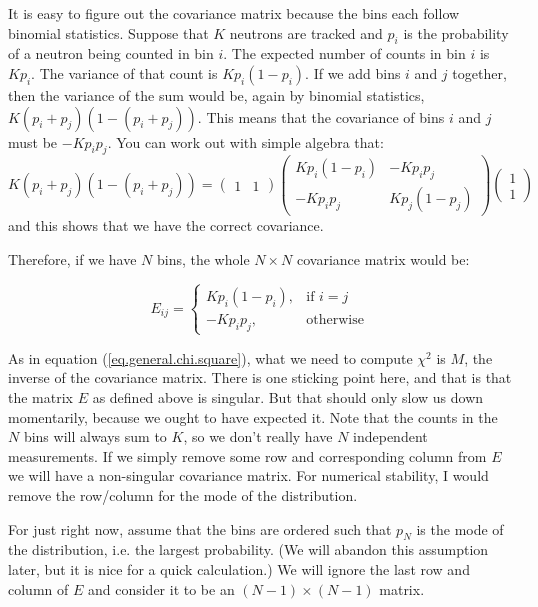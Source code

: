\documentclass[letterpaper,12pt]{article}
\newcommand{\myMatrix}[1]{\bm{\mathit{#1}}}
\begin{document}
It is easy to figure out the covariance matrix because the bins each follow binomial statistics. Suppose that $K$ neutrons are tracked and $p_i$ is the probability of a neutron being counted in bin $i$. The expected number of counts in bin $i$ is $Kp_i$. The variance of that count is $Kp_i(1-p_i)$. If we add bins $i$ and $j$ together, then the variance of the sum would be, again by binomial statistics, $K(p_i+p_j)(1-(p_i+p_j))$. This means that the covariance of bins $i$ and $j$ must be $-Kp_ip_j$. You can work out with simple algebra that:
\begin{equation}
	K(p_i+p_j)(1-(p_i+p_j))=
	\begin{pmatrix}
		1 & 1
	\end{pmatrix}
	\begin{pmatrix}
	Kp_i(1-p_i) & -Kp_ip_j \\
	-Kp_ip_j & Kp_j(1-p_j) 
	\end{pmatrix}
	\begin{pmatrix}
	1 \\
	1
	\end{pmatrix}
\end{equation}
and this shows that we have the correct covariance.

Therefore, if we have $N$ bins, the whole $N \times N$ covariance matrix would be:

\begin{equation} \label{eq.cov.E}
	\myMatrix{E}_{ij}=
	\begin{cases}
		Kp_i(1-p_i), & \text{if } i=j \\
		-Kp_ip_j,  & \text{otherwise}
	\end{cases}
\end{equation}

As in equation (\ref{eq.general.chi.square}), what we need to compute $\chi^2$ is $\myMatrix{M}$, the inverse of the covariance matrix. There is one sticking point here, and that is that the matrix $\myMatrix{E}$ as defined above is singular. But that should only slow us down momentarily, because we ought to have expected it. Note that the counts in the $N$ bins will always sum to $K$, so we don't really have $N$ independent measurements. If we simply remove some row and corresponding column from $\myMatrix{E}$ we will have a non-singular covariance matrix. For numerical stability, I would remove the row/column for the mode of the distribution.

For just right now, assume that the bins are ordered such that $p_N$ is the mode of the distribution, i.e. the largest probability. (We will abandon this assumption later, but it is nice for a quick calculation.) We will ignore the last row and column of $\myMatrix{E}$ and consider it to be an $(N-1) \times (N-1)$ matrix.
\end{document}
